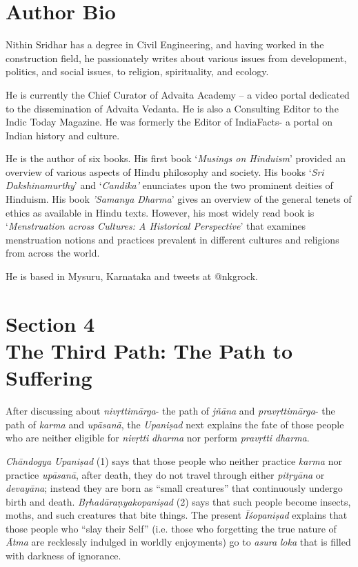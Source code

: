 \chapter{\textbf{Author Bio}}

Nithin Sridhar has a degree in Civil Engineering, and having worked in the construction field, he passionately writes about various issues from development, politics, and social issues, to religion, spirituality, and ecology.

He is currently the Chief Curator of Advaita Academy -- a video portal dedicated to the dissemination of Advaita Vedanta. He is also a Consulting Editor to the Indic Today Magazine. He was formerly the Editor of IndiaFacts- a portal on Indian history and culture.

He is the author of six books. His first book `\emph{Musings on Hinduism}' provided an overview of various aspects of Hindu philosophy and society. His books `\emph{Sri Dakshinamurthy}' and `\emph{Candika'} enunciates upon the two prominent deities of Hinduism. His book \emph{'Samanya Dharma}' gives an overview of the general tenets of ethics as available in Hindu texts. However, his most widely read book is `\emph{Menstruation across Cultures: A Historical Perspective}' that examines menstruation notions and practices prevalent in different cultures and religions from across the world.

He is based in Mysuru, Karnataka and tweets at @nkgrock.



\chapter{Section 4\\ The Third Path: The Path to Suffering}

After discussing about \emph{nivṛttimārga}- the path of \emph{jñāna} and \emph{pravṛttimārga}- the path of \emph{karma} and \emph{upāsanā}, the \emph{Upaniṣad} next explains the fate of those people who are neither eligible for \emph{nivṛtti} \emph{dharma} nor perform \emph{pravṛtti} \emph{dharma}.

\emph{Chāndogya} \emph{Upaniṣad} (1) says that those people who neither practice \emph{karma} nor practice \emph{upāsanā}, after death, they do not travel through either \emph{pitṛyāna} or \emph{devayāna}; instead they are born as ``small creatures'' that continuously undergo birth and death. \emph{Bṛhadāraṇyakopaniṣad} (2) says that such people become insects, moths, and such creatures that bite things. The present \emph{Īśopaniṣad} explains that those people who ``slay their Self'' (i.e. those who forgetting the true nature of \emph{Ātma} are recklessly indulged in worldly enjoyments) go to \emph{asura} \emph{loka} that is filled with darkness of ignorance.

